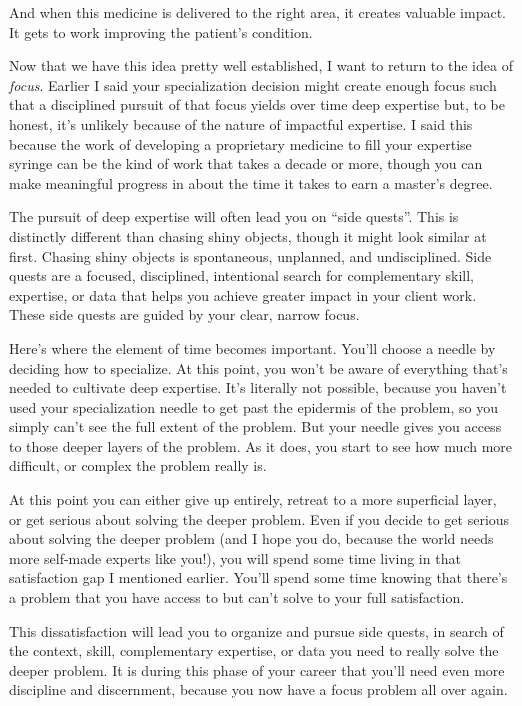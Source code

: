 And when this medicine is delivered to the right area, it creates valuable impact. It gets to work improving the patient's condition.

Now that we have this idea pretty well established, I want to return to the idea of \emph{focus}. Earlier I said your specialization decision might create enough focus such that a disciplined pursuit of that focus yields over time deep expertise but, to be honest, it's unlikely because of the nature of impactful expertise. I said this because the work of developing a proprietary medicine to fill your expertise syringe can be the kind of work that takes a decade or more, though you can make meaningful progress in about the time it takes to earn a master's degree.

The pursuit of deep expertise will often lead you on ``side quests''. This is distinctly different than chasing shiny objects, though it might look similar at first. Chasing shiny objects is spontaneous, unplanned, and undisciplined. Side quests are a focused, disciplined, intentional search for complementary skill, expertise, or data that helps you achieve greater impact in your client work. These side quests are guided by your clear, narrow focus.

Here's where the element of time becomes important. You'll choose a needle by deciding how to specialize. At this point, you won't be aware of everything that's needed to cultivate deep expertise. It's literally not possible, because you haven't used your specialization needle to get past the epidermis of the problem, so you simply can't see the full extent of the problem. But your needle gives you access to those deeper layers of the problem. As it does, you start to see how much more difficult, or complex the problem really is.

At this point you can either give up entirely, retreat to a more superficial layer, or get serious about solving the deeper problem. Even if you decide to get serious about solving the deeper problem (and I hope you do, because the world needs more self-made experts like you!), you will spend some time living in that satisfaction gap I mentioned earlier. You'll spend some time knowing that there's a problem that you have access to but can't solve to your full satisfaction.

This dissatisfaction will lead you to organize and pursue side quests, in search of the context, skill, complementary expertise, or data you need to really solve the deeper problem. It is during this phase of your career that you'll need even more discipline and discernment, because you now have a focus problem all over again.

